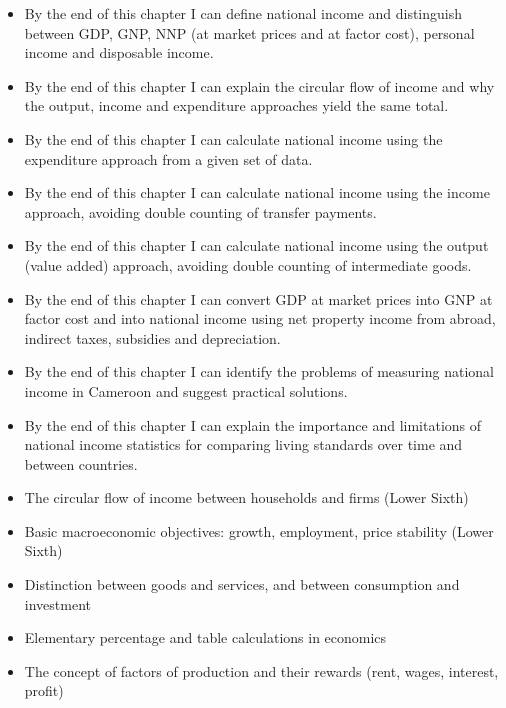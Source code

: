 \documentclass[11pt]{article}
\begin{document}
\begin{objectifs}
\begin{itemize}
\item By the end of this chapter I can define national income and distinguish between GDP, GNP, NNP (at market prices and at factor cost), personal income and disposable income.
\item By the end of this chapter I can explain the circular flow of income and why the output, income and expenditure approaches yield the same total.
\item By the end of this chapter I can calculate national income using the expenditure approach from a given set of data.
\item By the end of this chapter I can calculate national income using the income approach, avoiding double counting of transfer payments.
\item By the end of this chapter I can calculate national income using the output (value added) approach, avoiding double counting of intermediate goods.
\item By the end of this chapter I can convert GDP at market prices into GNP at factor cost and into national income using net property income from abroad, indirect taxes, subsidies and depreciation.
\item By the end of this chapter I can identify the problems of measuring national income in Cameroon and suggest practical solutions.
\item By the end of this chapter I can explain the importance and limitations of national income statistics for comparing living standards over time and between countries.
\end{itemize}
\end{objectifs}

\begin{prerequis}
\begin{itemize}
\item The circular flow of income between households and firms (Lower Sixth)
\item Basic macroeconomic objectives: growth, employment, price stability (Lower Sixth)
\item Distinction between goods and services, and between consumption and investment
\item Elementary percentage and table calculations in economics
\item The concept of factors of production and their rewards (rent, wages, interest, profit)
\end{itemize}
\end{prerequis}
\end{document}
